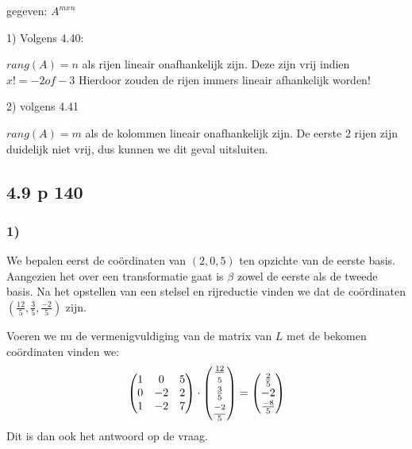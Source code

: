 \documentclass[lineaire_algebra_oplossingen.tex]{subfiles}
\begin{document}
gegeven: $ A ^ {m x n} $

1) Volgens 4.40: 

$rang(A) = n $ als rijen lineair onafhankelijk zijn.
Deze zijn vrij indien $x != -2 of -3$ Hierdoor zouden de rijen immers lineair afhankelijk worden! 

2) volgens 4.41

$rang(A) = m $ als de kolommen lineair onafhankelijk zijn. De eerste 2 rijen zijn duidelijk niet vrij, dus kunnen we dit geval uitsluiten.


\subsection{4.9 p 140}
\subsubsection*{1)}
We bepalen eerst de co\"ordinaten van $(2,0,5)$ ten opzichte van de eerste basis. Aangezien het over een transformatie gaat is $\beta$ zowel de eerste als de tweede basis. 
Na het opstellen van een stelsel en rijreductie vinden we dat de co\"ordinaten $\left(\frac{12}{5},\frac{3}{5},\frac{-2}{5}\right)$ zijn.

Voeren we nu de vermenigvuldiging van de matrix van $L$ met de bekomen co\"ordinaten vinden we:\\
$$
\begin{pmatrix}
1&0&5\\
0&-2&2\\
1&-2&7
\end{pmatrix}
\cdot
\begin{pmatrix}
\frac{12}{\strut5}\\ \frac{3}{5}\\ \frac{\strut -2}{5}
\end{pmatrix}
=
\begin{pmatrix}
\strut \frac{2}{5}\\ -2\\ \strut \frac{-8}{5}
\end{pmatrix}
$$
Dit is dan ook het antwoord op de vraag.
\end{document}
